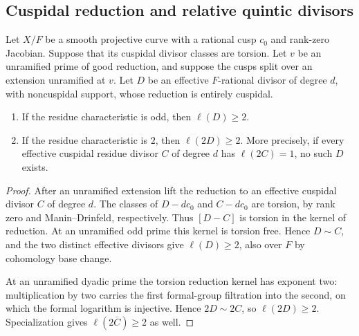 \subsection{Cuspidal reduction and relative quintic divisors}
\begin{lemma}\label{lem:decic-cuspidal-reduction}
Let $X/F$ be a smooth projective curve with a rational cusp $c_0$
and rank-zero Jacobian. Suppose that its cuspidal divisor classes
are torsion. Let $v$ be an unramified prime of good reduction,
and suppose the cusps split over an extension unramified at $v$.
Let $D$ be an effective $F$-rational divisor of degree $d$, with
noncuspidal support, whose reduction is entirely cuspidal.
\begin{enumerate}
\item If the residue characteristic is odd, then
$\ell(D)\geq2$.
\item If the residue characteristic is $2$, then
$\ell(2D)\geq2$. More precisely, if every effective cuspidal residue
divisor $C$ of degree $d$ has $\ell(2C)=1$, no such $D$ exists.
\end{enumerate}
\end{lemma}
\begin{proof}
After an unramified extension lift the reduction to an effective
cuspidal divisor $C$ of degree $d$. The classes of $D-dc_0$ and
$C-dc_0$ are torsion, by rank zero and Manin--Drinfeld, respectively.
Thus $[D-C]$ is torsion in the kernel of reduction.
At an unramified odd prime this kernel is torsion free. Hence
$D\sim C$, and the two distinct effective divisors give
$\ell(D)\geq2$, also over $F$ by cohomology base change.

At an unramified dyadic prime the torsion reduction kernel has
exponent two: multiplication by two carries the first formal-group
filtration into the second, on which the formal logarithm is
injective. Hence $2D\sim2C$, so $\ell(2D)\geq2$.
Specialization gives $\ell(2\overline C)\geq2$ as well.
\end{proof}

